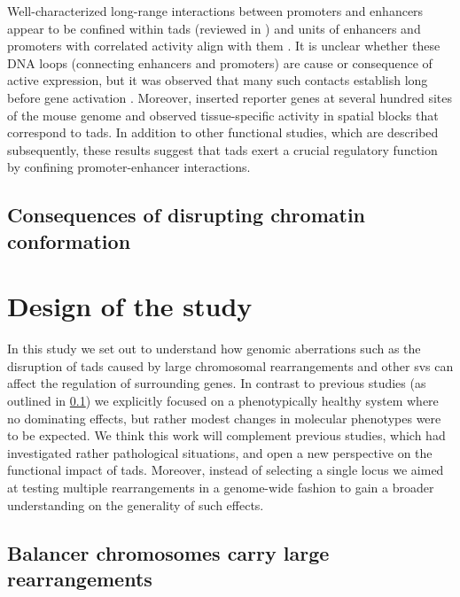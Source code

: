 Well-characterized long-range interactions between promoters and enhancers
appear to be confined within \acp{tad} (reviewed in \cite{Smallwood2013}) and
units of enhancers and promoters with correlated activity align with them
\citep{Shen2012}. It is unclear whether these DNA loops (connecting enhancers
and promoters) are cause or consequence of active expression, but it was
observed that many such contacts establish long before gene activation
\citep{Ghavi-Helm2014}. Moreover, \cite{Symmons2014} inserted reporter genes at
several hundred sites of the mouse genome and observed tissue-specific activity
in spatial blocks that correspond to \acp{tad}. In addition to other functional
studies, which are described subsequently, these results suggest that \acp{tad}
exert a crucial regulatory function by confining promoter-enhancer interactions.






\subsection{Consequences of disrupting chromatin conformation}
\label{sec:disrupting_tads}






\section{Design of the study}
\label{sec:balancer_study_design}

In this study we set out to understand how genomic aberrations such as the
disruption of \acp{tad} caused by large chromosomal rearrangements and other
\acp{sv} can affect the regulation of surrounding genes. In contrast to previous
studies (as outlined in \cref{sec:disrupting_tads}) we explicitly
focused on a phenotypically healthy system where no dominating effects, but
rather modest changes in molecular phenotypes were to be expected. We think this
work will complement previous studies, which had investigated rather
pathological situations, and open a new perspective on the functional impact of
\acp{tad}. Moreover, instead of selecting a single locus we aimed at testing
multiple rearrangements in a genome-wide fashion to gain a broader understanding
on the generality of such effects.




\subsection{Balancer chromosomes carry large rearrangements}
\label{sec:balancer_balancers}

